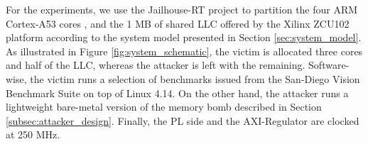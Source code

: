 %


    For the experiments, we use the Jailhouse-RT project \cite{ewarp2020rtss} to partition the four ARM Cortex-A53 cores \cite{ARM-cortex-A53}, and the 1 MB of shared LLC offered by the Xilinx ZCU102 platform \cite{Xilinx-ULTRASCALE-TRM} according to the system model presented in Section \ref{sec:system_model}.
    As illustrated in Figure \ref{fig:system_schematic}, the victim is allocated three cores and half of the LLC, whereas the attacker is left with the remaining.
    Software-wise, the victim runs a selection of benchmarks issued from the San-Diego Vision Benchmark Suite \cite{SD-VBS} on top of Linux 4.14.
    On the other hand, the attacker runs a lightweight bare-metal version of the memory bomb described in Section \ref{subsec:attacker_design}.
    Finally, the PL side and the AXI-Regulator are clocked at 250 MHz.\\

